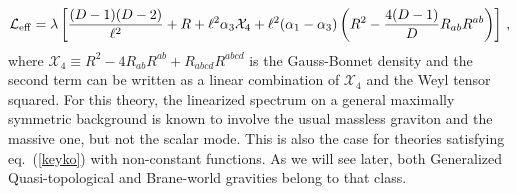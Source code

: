 \documentclass[11pt]{article}
\newcommand{\req}[1]{(\ref{#1})} %
\renewcommand{\req}[1]{eq.~(\ref{#1})}
\begin{document}
\begin{equation}\label{confi}
\mathcal{L}_{\rm eff}=\lambda \left[ \frac{(D-1)(D-2)}{\ell^2}+R + \ell^2 \alpha_3 \mathcal{X}_4 + \ell^2 (\alpha_1-\alpha_3) \left(R^2-\frac{4(D-1)}{D}R_{ab}R^{ab} \right)  \right]\, ,
\end{equation}
where $\mathcal{X}_4\equiv R^2-4R_{ab}R^{ab}+R_{abcd}R^{abcd}$ is the Gauss-Bonnet density and the second term can be written as a linear combination of  $\mathcal{X}_4$ and the Weyl tensor squared. For this theory, the linearized spectrum on a general maximally symmetric background is known to involve the usual massless graviton and the massive one, but not the scalar mode. This is also the case for theories satisfying \req{keyko} with non-constant functions. As we will see later, both Generalized Quasi-topological and Brane-world gravities belong to that class.
\end{document}
